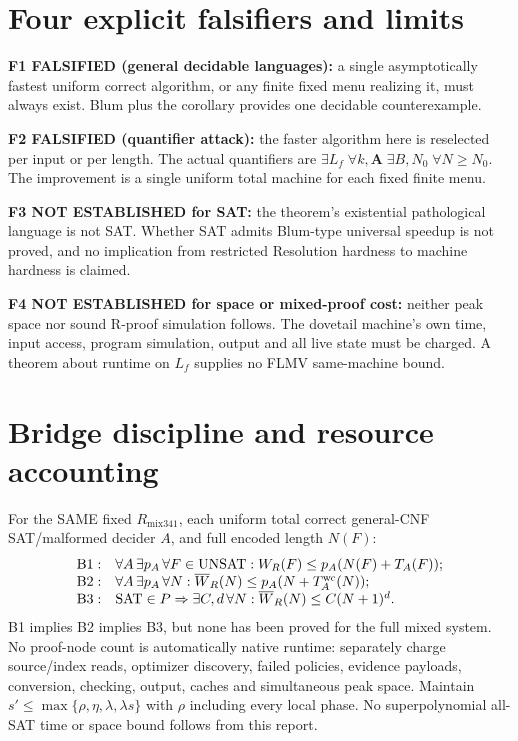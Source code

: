 \documentclass[11pt]{article}
\begin{document}
\section*{Four explicit falsifiers and limits}
\noindent\textbf{F1 FALSIFIED (general decidable languages):} a single asymptotically fastest uniform correct algorithm, or any finite fixed menu realizing it, must always exist. Blum plus the corollary provides one decidable counterexample.

\noindent\textbf{F2 FALSIFIED (quantifier attack):} the faster algorithm here is reselected per input or per length. The actual quantifiers are $\exists L_f\;\forall k,\mathbf A\;\exists B,N_0\;\forall N\ge N_0$. The improvement is a single uniform total machine for each fixed finite menu.

\noindent\textbf{F3 NOT ESTABLISHED for SAT:} the theorem's existential pathological language is not SAT. Whether SAT admits Blum-type universal speedup is not proved, and no implication from restricted Resolution hardness to machine hardness is claimed.

\noindent\textbf{F4 NOT ESTABLISHED for space or mixed-proof cost:} neither peak space nor sound R-proof simulation follows. The dovetail machine's own time, input access, program simulation, output and all live state must be charged. A theorem about runtime on $L_f$ supplies no FLMV same-machine bound.

\section*{Bridge discipline and resource accounting}
For the SAME fixed $R_{\mathrm{mix341}}$, each uniform total correct general-CNF SAT/malformed decider $A$, and full encoded length $N(F)$:
\[
\begin{array}{rl}
\mathrm{B1}: & \forall A\,\exists p_A\,\forall F\in\mathrm{UNSAT}:
W_R(F)\le p_A(N(F)+T_A(F));\\
\mathrm{B2}: & \forall A\,\exists p_A\,\forall N:
\overline W_R(N)\le p_A(N+T_A^{\rm wc}(N));\\
\mathrm{B3}: & \mathrm{SAT}\in P\Rightarrow
\exists C,d\,\forall N:\overline W_R(N)\le C(N+1)^d.
\end{array}
\]
B1 implies B2 implies B3, but none has been proved for the full mixed system. No proof-node count is automatically native runtime: separately charge source/index reads, optimizer discovery, failed policies, evidence payloads, conversion, checking, output, caches and simultaneous peak space. Maintain $s'\le\max\{\rho,\eta,\lambda,\lambda s\}$ with $\rho$ including every local phase. No superpolynomial all-SAT time or space bound follows from this report.
\end{document}
